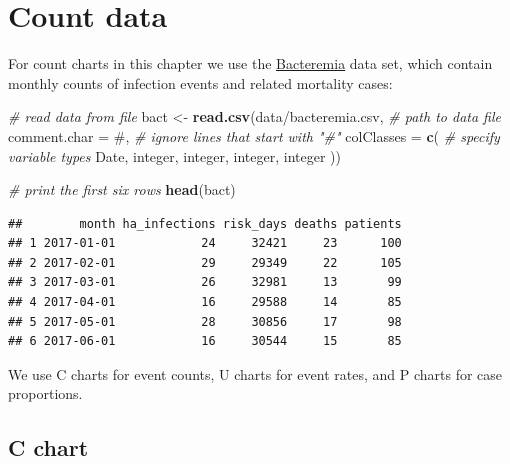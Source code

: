 \documentclass[
]{book}
\newenvironment{Shaded}{\begin{snugshade}}{\end{snugshade}}
\newcommand{\AttributeTok}[1]{\textcolor[rgb]{0.13,0.29,0.53}{#1}}
\newcommand{\CommentTok}[1]{\textcolor[rgb]{0.56,0.35,0.01}{\textit{#1}}}
\newcommand{\FunctionTok}[1]{\textcolor[rgb]{0.13,0.29,0.53}{\textbf{#1}}}
\newcommand{\NormalTok}[1]{#1}
\newcommand{\OtherTok}[1]{\textcolor[rgb]{0.56,0.35,0.01}{#1}}
\newcommand{\StringTok}[1]{\textcolor[rgb]{0.31,0.60,0.02}{#1}}
\begin{document}
\section{Count data}\label{count-data-1}

For count charts in this chapter we use the
\hyperref[bacteremia]{Bacteremia} data set, which contain monthly counts
of infection events and related mortality cases:

\begin{Shaded}
\begin{Highlighting}[]
\CommentTok{\# read data from file}
\NormalTok{bact }\OtherTok{\textless{}{-}} \FunctionTok{read.csv}\NormalTok{(}\StringTok{\textquotesingle{}data/bacteremia.csv\textquotesingle{}}\NormalTok{,  }\CommentTok{\# path to data file}
                 \AttributeTok{comment.char =} \StringTok{\textquotesingle{}\#\textquotesingle{}}\NormalTok{,     }\CommentTok{\# ignore lines that start with "\#"}
                 \AttributeTok{colClasses   =} \FunctionTok{c}\NormalTok{(       }\CommentTok{\# specify variable types}
                   \StringTok{\textquotesingle{}Date\textquotesingle{}}\NormalTok{,}
                   \StringTok{\textquotesingle{}integer\textquotesingle{}}\NormalTok{,}
                   \StringTok{\textquotesingle{}integer\textquotesingle{}}\NormalTok{,}
                   \StringTok{\textquotesingle{}integer\textquotesingle{}}\NormalTok{,}
                   \StringTok{\textquotesingle{}integer\textquotesingle{}}
\NormalTok{                 ))}

\CommentTok{\# print the first six rows}
\FunctionTok{head}\NormalTok{(bact)}
\end{Highlighting}
\end{Shaded}

\begin{verbatim}
##        month ha_infections risk_days deaths patients
## 1 2017-01-01            24     32421     23      100
## 2 2017-02-01            29     29349     22      105
## 3 2017-03-01            26     32981     13       99
## 4 2017-04-01            16     29588     14       85
## 5 2017-05-01            28     30856     17       98
## 6 2017-06-01            16     30544     15       85
\end{verbatim}

We use C charts for event counts, U charts for event rates, and P charts
for case proportions.

\subsection{C chart}\label{c-chart}
\end{document}
